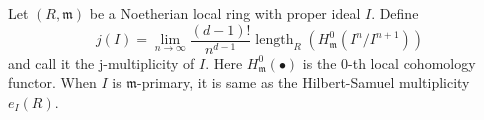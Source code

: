\documentclass[12pt]{article}
\def\length{\operatorname{length}}
\def\frakm{\mathfrak{m}}
\begin{document}
Let $(R,\frakm)$ be a Noetherian local ring with proper ideal $I$. Define
\[
j(I)=\lim_{n\to \infty} \frac{(d-1)!}{n^{d-1}} \length_R(H_\frakm^0(I^n/I^{n+1})) 
\]
and call it the j-multiplicity of $I$. Here $H_\frakm^0(\bullet)$ is the 0-th local cohomology functor. When $I$ is $\frakm$-primary, it is same as the Hilbert-Samuel multiplicity $e_I(R)$.
\end{document}
